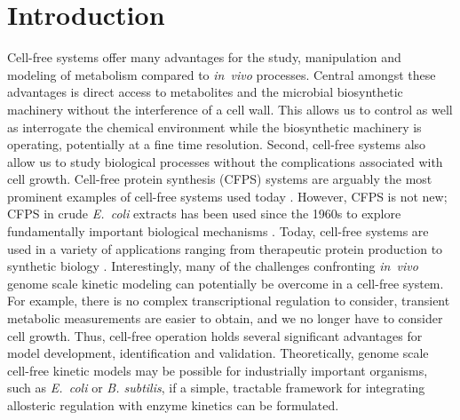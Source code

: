 \documentclass[journal=asbcd6,manuscript=article]{achemso}
\begin{document}
\section{Introduction}
Cell-free systems offer many advantages for the study, manipulation and modeling of metabolism compared to \textit{in~vivo} processes.
Central amongst these advantages is direct access to metabolites and the microbial biosynthetic machinery without the interference of a cell wall.
This allows us to control as well as interrogate the chemical environment while the biosynthetic machinery is operating, potentially at a fine time resolution.
Second, cell-free systems also allow us to study biological processes without the complications associated with cell growth.
Cell-free protein synthesis (CFPS) systems are arguably the most prominent examples of cell-free systems used today \cite{Jewett:2008aa}.
However, CFPS is not new; CFPS in crude \textit{E.~coli} extracts has been used since the 1960s to explore fundamentally important biological mechanisms \cite{MATTHAEI:1961aa,NIRENBERG:1961aa}.
Today, cell-free systems are used in a variety of applications ranging from therapeutic protein production \cite{Lu:2014aa} to synthetic biology \cite{Hodgman:2012aa}.
Interestingly, many of the challenges confronting \textit{in~vivo} genome scale kinetic modeling can potentially be overcome in a cell-free system.
For example, there is no complex transcriptional regulation to consider, transient metabolic measurements are easier to obtain, and we no longer have to consider cell growth.
Thus, cell-free operation holds several significant advantages for model development, identification and validation.
Theoretically, genome scale cell-free kinetic models may be possible for industrially important organisms, such as \textit{E.~coli} or \textit{B. subtilis}, if a simple, tractable framework for integrating allosteric regulation with enzyme kinetics can be formulated.
\end{document}
